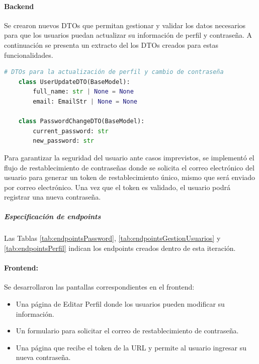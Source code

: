 \paragraph{Backend}
Se crearon nuevos DTOs que permitan gestionar y validar los datos necesarios para que los usuarios puedan actualizar su información de perfil y contraseña. A continuación se presenta un extracto del los DTOs creados para estas funcionalidades. 

\begin{lstlisting}[language=Python]
    # DTOs para la actualización de perfil y cambio de contraseña
    class UserUpdateDTO(BaseModel):
        full_name: str | None = None
        email: EmailStr | None = None

    class PasswordChangeDTO(BaseModel):
        current_password: str
        new_password: str
\end{lstlisting}

Para garantizar la seguridad del usuario ante casos imprevistos, se implementó el flujo de restablecimiento de contraseñas donde se solicita el correo electrónico del usuario para generar un token de restablecimiento único, mismo que será enviado por correo electrónico. Una vez que el token es validado, el usuario podrá registrar una nueva contraseña.

\subparagraph{Especificación de endpoints}
Las Tablas \ref{tab:endpointsPassword}, \ref{tab:endpointsGestionUsuarios} y \ref{tab:endpointsPerfil} indican los endpoints creados dentro de esta iteración.





\paragraph{Frontend:}
Se desarrollaron las pantallas correspondientes en el frontend:
\begin{itemize}
    \item Una página de Editar Perfil donde los usuarios pueden modificar su información.
    \item Un formulario para solicitar el correo de restablecimiento de contraseña.
    \item Una página que recibe el token de la URL y permite al usuario ingresar su nueva contraseña.
\end{itemize}

